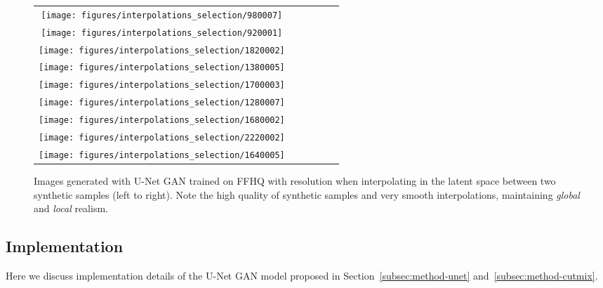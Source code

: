 \documentclass[10pt,twocolumn,letterpaper]{article}
\begin{document}
\begin{figure*}
\begin{centering}
\setlength{\tabcolsep}{0.1em}
\renewcommand{\arraystretch}{0}
\par\end{centering}
\begin{centering}
\vspace{-1.5em}
\hfill{}\begin{tabular}{c@{\hskip 0.05in}c@{\hskip 0.05in}c@{\hskip 0.05in}c@{\hskip 0.05in}c@{\hskip 0.05in}c}
\texttt{[image: figures/interpolations\_selection/980007]}\tabularnewline
\texttt{[image: figures/interpolations\_selection/920001]}\tabularnewline
\texttt{[image: figures/interpolations\_selection/1820002]}\tabularnewline
\texttt{[image: figures/interpolations\_selection/1380005]}\tabularnewline
\texttt{[image: figures/interpolations\_selection/1700003]}\tabularnewline
\texttt{[image: figures/interpolations\_selection/1280007]}\tabularnewline
\texttt{[image: figures/interpolations\_selection/1680002]}\tabularnewline
\texttt{[image: figures/interpolations\_selection/2220002]}\tabularnewline
\texttt{[image: figures/interpolations\_selection/1640005]}\tabularnewline







\end{tabular}\hfill{}
\par\end{centering}
\vspace{-0.5em}
\caption{\label{fig:qual_results} Images generated with U-Net GAN trained on FFHQ with resolution  when interpolating in the latent space between two synthetic samples (left to right). Note the high quality of synthetic samples and very smooth interpolations, maintaining \textit{global} and \textit{local} realism.} \vspace{0em}
\end{figure*}
 
\subsection{Implementation}
Here we discuss implementation details of the U-Net GAN model proposed in Section~\ref{subsec:method-unet} and~\ref{subsec:method-cutmix}.
\end{document}
